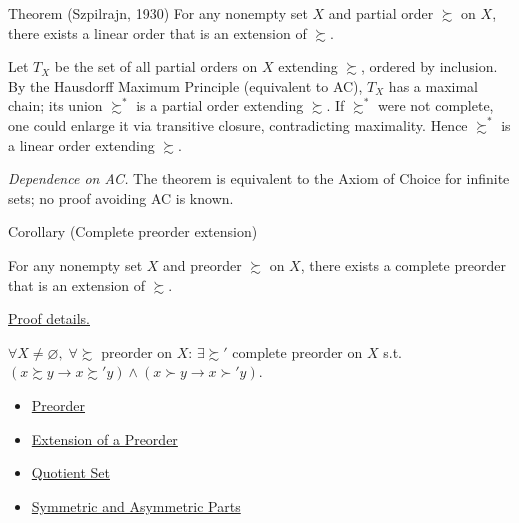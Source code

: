 \begin{theorembox}{Theorem (Szpilrajn, 1930)}
\label{thm:szpilrajn}
For any nonempty set $X$ and partial order $\succsim$ on $X$, there exists a
linear order that is an extension of $\succsim$.
\end{theorembox}

\begin{remark*}
Let $T_X$ be the set of all partial orders on $X$ extending $\succsim$,
ordered by inclusion. By the Hausdorff Maximum Principle (equivalent to
AC), $T_X$ has a maximal chain; its union $\succsim^*$ is a partial order
extending $\succsim$. If $\succsim^*$ were not complete, one could enlarge
it via transitive closure, contradicting maximality. Hence $\succsim^*$ is a
linear order extending $\succsim$.

\medskip
\noindent\textit{Dependence on AC.} The theorem is equivalent to the Axiom
of Choice for infinite sets; no proof avoiding AC is known.
\end{remark*}

\begin{corollarybox}{Corollary (Complete preorder extension)}
\begin{corollary}
\label{cor:complete-preorder-extension}
For any nonempty set $X$ and preorder $\succsim$ on $X$, there exists a
complete preorder that is an extension of $\succsim$.
\end{corollary}
\end{corollarybox}

\begin{remark*}[Proof]
\hyperref[prf:complete-preorder-extension]{Proof details.}
\end{remark*}

\begin{remark*}
$\forall X \neq \varnothing,\; \forall \succsim$ preorder on $X$: $\exists \succsim'$ complete preorder on $X$ s.t.\ $(x \succsim y \to x \succsim' y) \wedge (x \succ y \to x \succ' y)$.
\end{remark*}

\begin{dependencies}
\begin{itemize}
  \item \hyperref[def:preorder]{Preorder}
  \item \hyperref[def:preorder-extension]{Extension of a Preorder}
  \item \hyperref[def:quotient-set]{Quotient Set}
  \item \hyperref[def:sym-asym]{Symmetric and Asymmetric Parts}
\end{itemize}
\end{dependencies}


